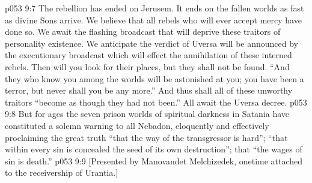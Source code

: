 \vs p053 9:7 The rebellion has ended on Jerusem. It ends on the fallen worlds as fast as divine Sons arrive. We believe that all rebels who will ever accept mercy have done so. We await the flashing broadcast that will deprive these traitors of personality existence. We anticipate the verdict of Uversa will be announced by the executionary broadcast which will effect the annihilation of these interned rebels. Then will you look for their places, but they shall not be found. “And they who know you among the worlds will be astonished at you; you have been a terror, but never shall you be any more.” And thus shall all of these unworthy traitors “become as though they had not been.” All await the Uversa decree.
\vs p053 9:8 But for ages the seven prison worlds of spiritual darkness in Satania have constituted a solemn warning to all Nebadon, eloquently and effectively proclaiming the great truth “that the way of the transgressor is hard”; “that within every sin is concealed the seed of its own destruction”; that “the wages of sin is death.”
\vsetoff
\vs p053 9:9 [Presented by Manovandet Melchizedek, onetime attached to the receivership of Urantia.]
\quizlink
